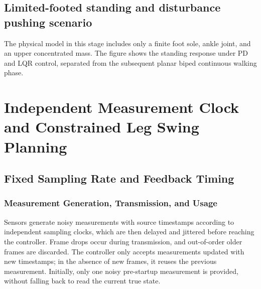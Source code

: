 \subsection{Limited-footed standing and disturbance pushing scenario}
The physical model in this stage includes only a finite foot sole, ankle joint, and an upper concentrated mass. The figure shows the standing response under PD and LQR control, separated from the subsequent planar biped continuous walking phase.




\FloatBarrier

\section{Independent Measurement Clock and Constrained Leg Swing Planning}

\label{stage:s20}

\subsection{Fixed Sampling Rate and Feedback Timing}\label{s20-detail-1}

\subsubsection{Measurement Generation, Transmission, and Usage}\label{s20-detail-2}

Sensors generate noisy measurements with source timestamps according to independent sampling clocks, which are then delayed and jittered before reaching the controller. Frame drops occur during transmission, and out-of-order older frames are discarded. The controller only accepts measurements updated with new timestamps; in the absence of new frames, it reuses the previous measurement. Initially, only one noisy pre-startup measurement is provided, without falling back to read the current true state.

